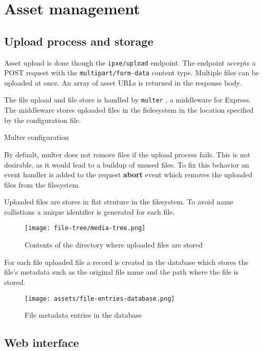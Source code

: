 \documentclass[../main.tex]{subfiles}
\begin{document}
\section{Asset management}

\subsection{Upload process and storage}

Asset upload is done though the \texttt{ipxe/upload} endpoint. The endpoint accepts a POST request with the \texttt{multipart/form-data} content type.
Multiple files can be uploaded at once. An array of asset URLs is returned in the response body.

The file upload and file store is handled by \texttt{multer} \cite{multer}, a middleware for Express.
The middleware stores uploaded files in the fielesystem in the location specified by the configuration file.

\begin{listing}[H]
  \caption{Multer configuration}
\end{listing}

By defualt, multer does not remove files if the upload process fails. This is not desirable, as it would lead to a buildup of unused files.
To fix this behavior an event handler is added to the request \textbf{abort} event which removes the uploaded files from the filesystem.

Uploaded files are stores in flat struture in the filesystem. To avoid name collistions a unique identifier is generated for each file.

\begin{figure}[H]
  \centering
  \texttt{[image: file-tree/media-tree.png]}
  \caption{Contents of the directory where uploaded files are stored}
\end{figure}

For each file uploaded file a record is created in the database which stores the file's metadata such as the original file name and the path where the file is stored.

\begin{figure}[H]
  \centering
  \texttt{[image: assets/file-entries-database.png]}
  \caption{File metadata entries in the database}
\end{figure}

\subsection{Web interface}
\end{document}
